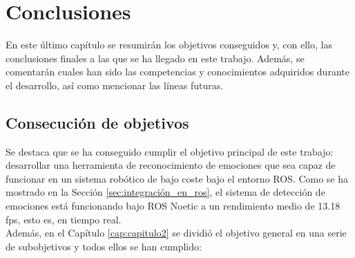 \chapter{Conclusiones}
\label{cap:capitulo6}

En este último capítulo se resumirán los objetivos conseguidos y, con ello, las conclusiones finales a las que se ha llegado en este trabajo. Además, se comentarán cuales han sido las competencias y conocimientos adquiridos durante el desarrollo, así como mencionar las líneas futuras.

\section{Consecución de objetivos}

Se destaca que se ha conseguido cumplir el objetivo principal de este trabajo: desarrollar una herramienta de reconocimiento de emociones que sea capaz de funcionar en un sistema robótico de bajo coste bajo el entorno ROS. Como se ha mostrado en la Sección \ref{sec:integración_en_ros}, el sistema de detección de emociones está funcionando bajo ROS Noetic a un rendimiento medio de 13.18 fps, esto es, en tiempo real.\\

Además, en el Capítulo \ref{cap:capitulo2} se dividió el objetivo general en una serie de subobjetivos y todos ellos se han cumplido:

